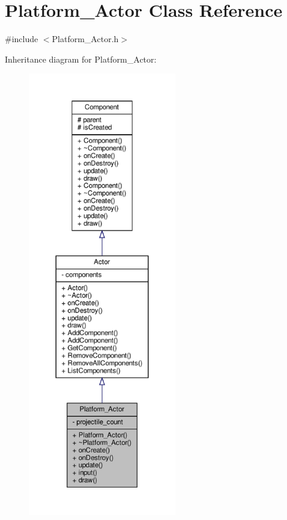 \hypertarget{classPlatform__Actor}{}\section{Platform\+\_\+\+Actor Class Reference}
\label{classPlatform__Actor}


{\ttfamily \#include $<$Platform\+\_\+\+Actor.\+h$>$}



Inheritance diagram for Platform\+\_\+\+Actor\+:
\nopagebreak
\begin{figure}[H]
\begin{center}
\leavevmode
\includegraphics[height=550pt]{classPlatform__Actor__inherit__graph}
\end{center}
\end{figure}


